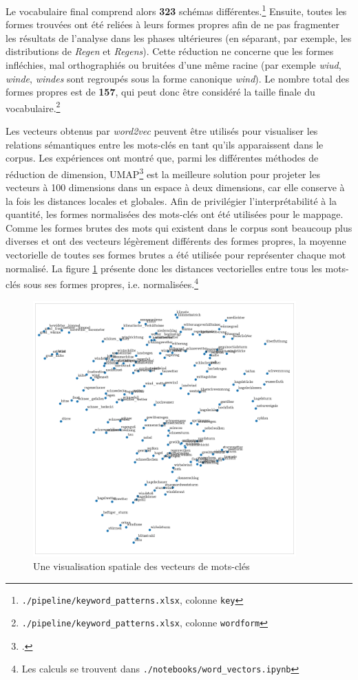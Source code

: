 \documentclass[a4paper,twoside,12pt]{article}
\begin{document}
Le vocabulaire final comprend alors \textbf{323} schémas différentes.\footnote{\texttt{./pipeline/keyword\_patterns.xlsx}, colonne \texttt{key}} Ensuite, toutes les formes trouvées ont été reliées à leurs formes propres afin de ne pas fragmenter les résultats de l'analyse dans les phases ultérieures (en séparant, par exemple, les distributions de \textit{Regen} et \textit{Regens}). Cette réduction ne concerne que les formes infléchies, mal orthographiés ou bruitées d'une même racine (par exemple \textit{wiud}, \textit{winde}, \textit{windes} sont regroupés sous la forme \og canonique \fg{} \textit{wind}). Le nombre total des formes propres est de \textbf{157}, qui peut donc être considéré la taille finale du vocabulaire.\footnote{\texttt{./pipeline/keyword\_patterns.xlsx}, colonne \texttt{wordform}}

Les vecteurs obtenus par \textit{word2vec} peuvent être utilisés pour visualiser les relations sémantiques entre les mots-clés en tant qu'ils apparaissent dans le corpus. Les expériences ont montré que, parmi les différentes méthodes de réduction de dimension, UMAP\footcite{mcinnes_umap_2020} est la meilleure solution pour projeter les vecteurs à 100 dimensions dans un espace à deux dimensions, car elle conserve à la fois les distances locales et globales. Afin de privilégier l'interprétabilité à la quantité, les formes normalisées des mots-clés ont été utilisées pour le mappage. Comme les formes brutes des mots qui existent dans le corpus sont beaucoup plus diverses et ont des vecteurs légèrement différents des formes propres, la moyenne vectorielle de toutes ses formes brutes a été utilisée pour représenter chaque mot normalisé. La figure \ref{fig:keyword_umap} présente donc les distances vectorielles entre tous les mots-clés sous ses formes propres, i.e. normalisées.\footnote{Les calculs se trouvent dans \texttt{./notebooks/word\_vectors.ipynb}}

\begin{figure}[h]
    \centering
    \includegraphics[width=0.9\textwidth]{images/keyword_umap.pdf}
    \caption{Une visualisation spatiale des vecteurs de mots-clés}
    \label{fig:keyword_umap}
\end{figure}
\end{document}
